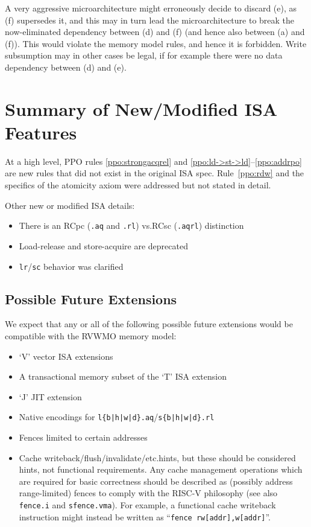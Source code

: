 A very aggressive microarchitecture might erroneously decide to discard (e), as (f) supersedes it, and this may in turn lead the microarchitecture to break the now-eliminated dependency between (d) and (f) (and hence also between (a) and (f)).
This would violate the memory model rules, and hence it is forbidden.
Write subsumption may in other cases be legal, if for example there were no data dependency between (d) and (e).

\section{Summary of New/Modified ISA Features}

At a high level, PPO rules \ref{ppo:strongacqrel} and \ref{ppo:ld->st->ld}--\ref{ppo:addrpo} are new rules that did not exist in the original ISA spec.  Rule~\ref{ppo:rdw} and the specifics of the atomicity axiom were addressed but not stated in detail.

Other new or modified ISA details:
\begin{itemize}
  \item There is an RCpc ({\tt .aq} and {\tt .rl}) vs.\@ RCsc ({\tt .aqrl}) distinction
  \item Load-release and store-acquire are deprecated
  \item {\tt lr}/{\tt sc} behavior was clarified
\end{itemize}

\subsection{Possible Future Extensions}

We expect that any or all of the following possible future extensions would be compatible with the RVWMO memory model:

\begin{itemize}
  \item `V' vector ISA extensions
  \item A transactional memory subset of the `T' ISA extension
  \item `J' JIT extension
  \item Native encodings for {\tt l\{b|h|w|d\}.aq}/{\tt s\{b|h|w|d\}.rl}
  \item Fences limited to certain addresses
  \item Cache writeback/flush/invalidate/etc.\@ hints, but these should be considered hints, not functional requirements.  Any cache management operations which are required for basic correctness should be described as (possibly address range-limited) fences to comply with the RISC-V philosophy (see also {\tt fence.i} and {\tt sfence.vma}).  For example, a functional cache writeback instruction might instead be written as ``{\tt fence~rw[addr],w[addr]}''.
\end{itemize}

